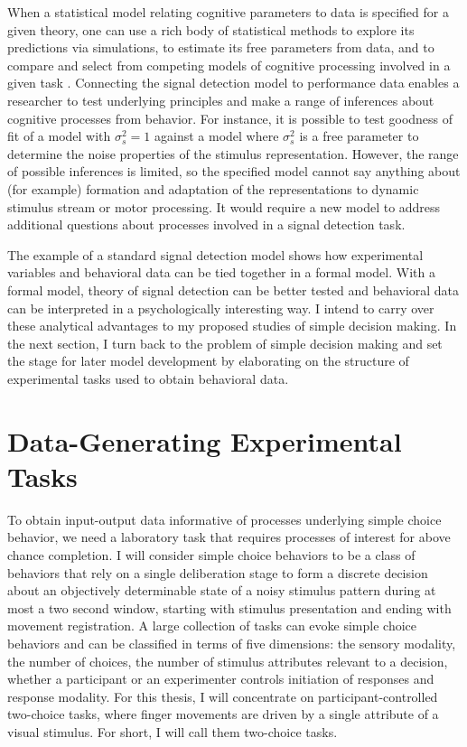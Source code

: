 \documentclass[12pt]{report}
\begin{document}
When a statistical model relating cognitive parameters to
data is specified for a given theory, one can use a rich body of
statistical methods to explore its predictions via simulations, to estimate
its free parameters from data, and to compare and select from
competing models of cognitive processing involved in a given task
\citep{Ber1997,CasBer2002,GelCar2013}. Connecting the signal detection
model to performance data enables a researcher to test underlying principles and make a range of
inferences about cognitive processes from behavior. For
instance, it is possible to test goodness of fit of a model with
$\sigma_s^2 = 1$ against a model where $\sigma_s^2$ is a free parameter to
determine the noise properties of the stimulus
representation. However, the range of possible inferences is limited, so
the specified model cannot say anything about (for example) formation and
adaptation of the representations to dynamic stimulus stream or motor processing. It would require a new model to address additional questions about processes involved in a signal
detection task.

The example of a standard signal detection model shows how experimental variables and behavioral data can be tied together in a formal model. With a formal model, theory of signal detection can be better tested and behavioral data can be interpreted in a psychologically interesting way. I intend to carry over these analytical advantages to my proposed studies of simple decision making. In the next section, I turn back to the problem of simple decision making and set the stage for later model development by elaborating on the structure of experimental tasks used to obtain behavioral data.

\section{Data-Generating Experimental Tasks}
\label{sec:tasks}
To obtain input-output data informative of processes underlying simple choice behavior, we need a laboratory task that requires processes of interest for above chance completion. I will consider simple choice behaviors to be a class of behaviors that rely on a single deliberation stage to form a discrete decision about an objectively determinable state of a noisy stimulus pattern during at most a two second window, starting with stimulus presentation and ending with movement registration. A large collection of tasks can evoke simple choice behaviors and can be classified in terms of five dimensions:
the sensory modality, the number of choices, the number of stimulus
attributes relevant to a decision, whether a
participant or an experimenter controls initiation of responses and response modality. For this thesis, I will concentrate
on participant-controlled two-choice tasks, where finger movements are driven by a single attribute of a visual stimulus. For short, I will call them two-choice tasks. 
\end{document}
